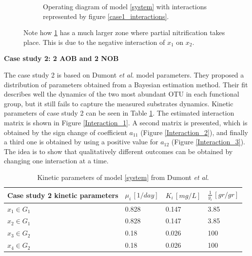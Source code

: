 \documentclass[3p,times]{article}
\begin{document}
\begin{figure}[h]
\begin{subfigure}[b]{0.45\textwidth}
	\caption{Operating diagram of model \eqref{system} with interactions represented by figure \ref{case1_interactions}.}
	\label{OD_interactions}
	\end{subfigure}
	\caption{Note how \ref{OD_interactions} has a much larger zone where partial nitrification takes place. This is due to the negative interaction of $x_1$ on $x_2$.}
	\label{OD_case_1}
\end{figure} 
\clearpage

\textbf{Case study 2: 2 AOB and 2 NOB}

 The case study 2 is based on Dumont \textit{et al.}\cite{Dumont2016} model parameters. They proposed a distribution of parameters obtained from a Bayesian estimation method. Their fit describes well the dynamics of the two most abundant OTU in each functional group, but it still fails to capture the measured substrates dynamics. Kinetic parameters of case study 2 can be seen in Table \ref{kinetic_parameters}. The estimated interaction matrix is shown in Figure \ref{Interaction_1}. A second matrix is presented, which is obtained by the sign change of coefficient $a_{11}$ (Figure \ref{Interaction_2}), and finally a third one is obtained by using a positive value for $a_{12}$ (Figure \ref{Interaction_3}). The idea is to show that qualitatively different outcomes can be obtained by changing one interaction at a time.
 
 \begin{table}[ht]
 	\centering
 	\begin{tabular}{|l|l|l|l|}
 		\hline \rule{0pt}{3.5ex}
 		Case study 2 kinetic parameters & $\mu_i\,[1/day]$ & $K_i\,[mg/L]$ & $\frac{1}{y_i} \, [gr/gr]$ \\ \hline 
 		$x_1 \in G_1$ & 0.828  & 0.147 & 3.85  \\ \hline
 		$x_2\in G_1$ &0.828   & 0.147 &  3.85\\ \hline
 		$x_3\in G_2$ & 0.18 & 0.026 &  100 \\ \hline
 		$x_4\in G_2$ & 0.18 & 0.026 &  100 \\ \hline
 	\end{tabular}
 	\caption{Kinetic parameters of model \eqref{system} from Dumont \textit{et al.} \cite{Dumont2016}}
 	\label{kinetic_parameters}
 \end{table}
\end{document}
